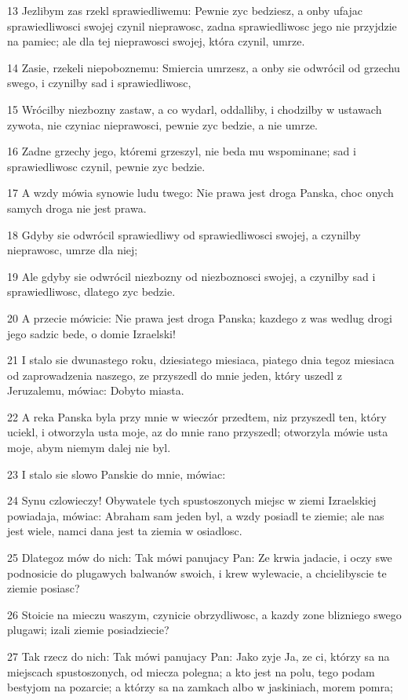\par 13 Jezlibym zas rzekl sprawiedliwemu: Pewnie zyc bedziesz, a onby ufajac sprawiedliwosci swojej czynil nieprawosc, zadna sprawiedliwosc jego nie przyjdzie na pamiec; ale dla tej nieprawosci swojej, która czynil, umrze.
\par 14 Zasie, rzekeli niepoboznemu: Smiercia umrzesz, a onby sie odwrócil od grzechu swego, i czynilby sad i sprawiedliwosc,
\par 15 Wrócilby niezbozny zastaw, a co wydarl, oddalliby, i chodzilby w ustawach zywota, nie czyniac nieprawosci, pewnie zyc bedzie, a nie umrze.
\par 16 Zadne grzechy jego, któremi grzeszyl, nie beda mu wspominane; sad i sprawiedliwosc czynil, pewnie zyc bedzie.
\par 17 A wzdy mówia synowie ludu twego: Nie prawa jest droga Panska, choc onych samych droga nie jest prawa.
\par 18 Gdyby sie odwrócil sprawiedliwy od sprawiedliwosci swojej, a czynilby nieprawosc, umrze dla niej;
\par 19 Ale gdyby sie odwrócil niezbozny od niezboznosci swojej, a czynilby sad i sprawiedliwosc, dlatego zyc bedzie.
\par 20 A przecie mówicie: Nie prawa jest droga Panska; kazdego z was wedlug drogi jego sadzic bede, o domie Izraelski!
\par 21 I stalo sie dwunastego roku, dziesiatego miesiaca, piatego dnia tegoz miesiaca od zaprowadzenia naszego, ze przyszedl do mnie jeden, który uszedl z Jeruzalemu, mówiac: Dobyto miasta.
\par 22 A reka Panska byla przy mnie w wieczór przedtem, niz przyszedl ten, który uciekl, i otworzyla usta moje, az do mnie rano przyszedl; otworzyla mówie usta moje, abym niemym dalej nie byl.
\par 23 I stalo sie slowo Panskie do mnie, mówiac:
\par 24 Synu czlowieczy! Obywatele tych spustoszonych miejsc w ziemi Izraelskiej powiadaja, mówiac: Abraham sam jeden byl, a wzdy posiadl te ziemie; ale nas jest wiele, namci dana jest ta ziemia w osiadlosc.
\par 25 Dlategoz mów do nich: Tak mówi panujacy Pan: Ze krwia jadacie, i oczy swe podnosicie do plugawych balwanów swoich, i krew wylewacie, a chcielibyscie te ziemie posiasc?
\par 26 Stoicie na mieczu waszym, czynicie obrzydliwosc, a kazdy zone blizniego swego plugawi; izali ziemie posiadziecie?
\par 27 Tak rzecz do nich: Tak mówi panujacy Pan: Jako zyje Ja, ze ci, którzy sa na miejscach spustoszonych, od miecza polegna; a kto jest na polu, tego podam bestyjom na pozarcie; a którzy sa na zamkach albo w jaskiniach, morem pomra;
